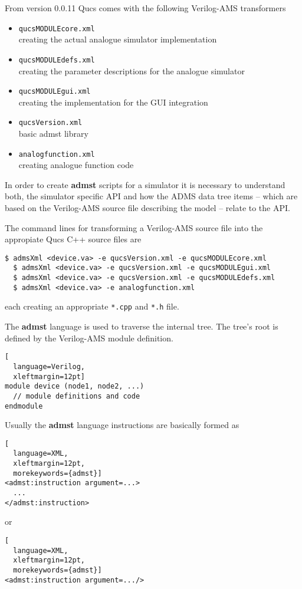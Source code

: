 From version 0.0.11 Qucs comes with the following Verilog-AMS
transformers
\begin{itemize}
\item \verb+qucsMODULEcore.xml+\\
creating the actual analogue simulator implementation
\item \verb+qucsMODULEdefs.xml+\\
creating the parameter descriptions for the analogue simulator
\item \verb+qucsMODULEgui.xml+\\
creating the implementation for the GUI integration
\item \verb+qucsVersion.xml+\\
basic admst library
\item \verb+analogfunction.xml+\\
creating analogue function code
\end{itemize}

In order to create \textbf{admst} scripts for a simulator it is
necessary to understand both, the simulator specific API and how the
ADMS data tree items -- which are based on the Verilog-AMS source file
describing the model -- relate to the API.

\addvspace{12pt}

The command lines for transforming a Verilog-AMS source file into the
appropiate Qucs C++ source files are
\begin{Verbatim}[fontsize=\small]
  $ admsXml <device.va> -e qucsVersion.xml -e qucsMODULEcore.xml
  $ admsXml <device.va> -e qucsVersion.xml -e qucsMODULEgui.xml
  $ admsXml <device.va> -e qucsVersion.xml -e qucsMODULEdefs.xml
  $ admsXml <device.va> -e analogfunction.xml
\end{Verbatim}

each creating an appropriate \verb+*.cpp+ and \verb+*.h+ file.

\addvspace{12pt}

The \textbf{admst} language is used to traverse the internal tree.
The tree's root is defined by the Verilog-AMS module definition.
\begin{lstlisting}[
  language=Verilog,
  xleftmargin=12pt]
module device (node1, node2, ...)
  // module definitions and code
endmodule
\end{lstlisting}


Usually the \textbf{admst} language instructions are basically formed
as
\begin{lstlisting}[
  language=XML,
  xleftmargin=12pt,
  morekeywords={admst}]
<admst:instruction argument=...>
  ...
</admst:instruction>
\end{lstlisting}
or
\begin{lstlisting}[
  language=XML,
  xleftmargin=12pt,
  morekeywords={admst}]
<admst:instruction argument=.../>
\end{lstlisting}

